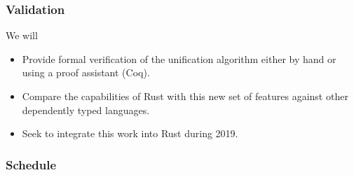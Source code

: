 \documentclass{beamer}
\begin{document}
\begin{frame}[fragile]
    \frametitle{Validation}
    We will
    \begin{itemize}
        \item Provide formal verification of the unification algorithm either by hand or using a proof assistant (Coq).
        \item Compare the capabilities of Rust with this new set of features against other dependently typed languages.
        \item Seek to integrate this work into Rust during 2019.
    \end{itemize}
\end{frame}

\begin{frame}[fragile]
    \frametitle{Schedule}
\end{frame}
\end{document}
